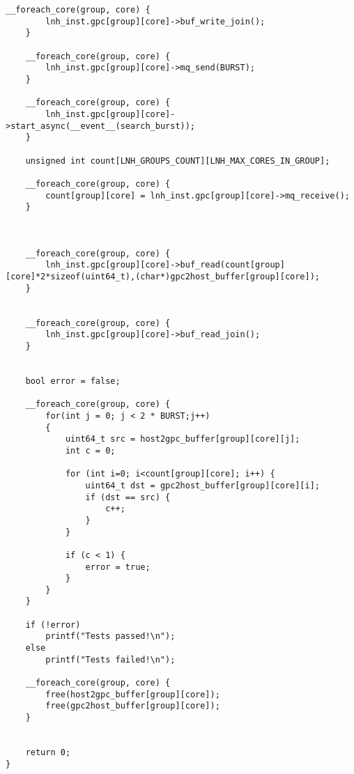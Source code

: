 \begin{lstlisting}[caption={Код программы по индивидуальному варианту host\_main.cpp}, label=lst1, style=Go]
	__foreach_core(group, core) {
		lnh_inst.gpc[group][core]->buf_write_join();
	}

	__foreach_core(group, core) {
		lnh_inst.gpc[group][core]->mq_send(BURST);
	}

	__foreach_core(group, core) {
		lnh_inst.gpc[group][core]->start_async(__event__(search_burst));
	}

	unsigned int count[LNH_GROUPS_COUNT][LNH_MAX_CORES_IN_GROUP];

	__foreach_core(group, core) {
		count[group][core] = lnh_inst.gpc[group][core]->mq_receive();
	}



	__foreach_core(group, core) {
		lnh_inst.gpc[group][core]->buf_read(count[group][core]*2*sizeof(uint64_t),(char*)gpc2host_buffer[group][core]);
	}


	__foreach_core(group, core) {
		lnh_inst.gpc[group][core]->buf_read_join();
	}


	bool error = false;

	__foreach_core(group, core) {
		for(int j = 0; j < 2 * BURST;j++)
        {
            uint64_t src = host2gpc_buffer[group][core][j];
            int c = 0;

            for (int i=0; i<count[group][core]; i++) {
				uint64_t dst = gpc2host_buffer[group][core][i];
	            if (dst == src) {
	            	c++;
	            }
			}

            if (c < 1) {
                error = true;
            }
        }
	}

	if (!error)
		printf("Tests passed!\n");
	else
		printf("Tests failed!\n");

	__foreach_core(group, core) {
		free(host2gpc_buffer[group][core]);
		free(gpc2host_buffer[group][core]);
	}


	return 0;
}
\end{lstlisting}
